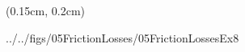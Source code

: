 \documentclass[9pt,xcolor={svgnames, x11names},professionalfonts, mathserif]{beamer}
\begin{document}

\begin{frame}
	\begin{textblock*}{1\columnwidth}(0.15cm, 0.2cm)
		\begin{cfig}[0.6]{../../figs/05FrictionLosses/05FrictionLossesEx8}\end{cfig}
	\end{textblock*}
\end{frame}
\end{document}
